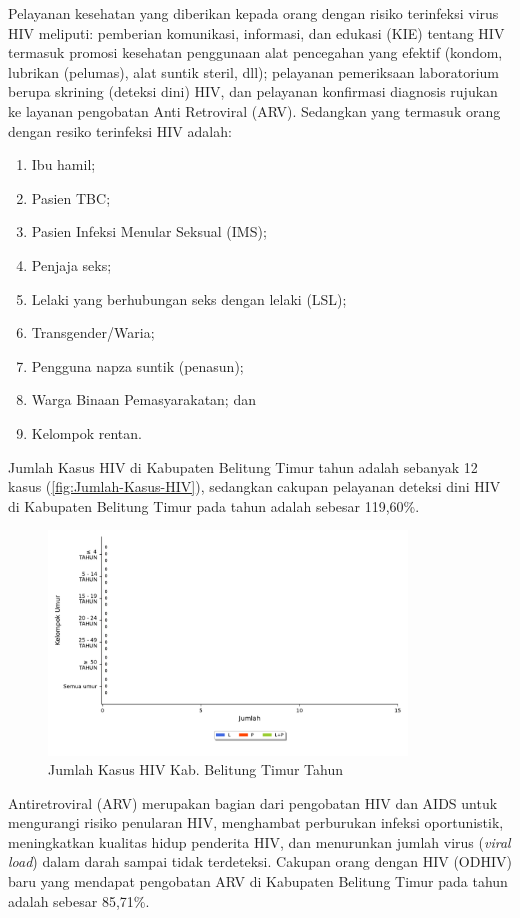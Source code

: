 Pelayanan kesehatan yang diberikan kepada orang dengan risiko terinfeksi virus HIV meliputi: pemberian komunikasi, informasi, dan edukasi (KIE) tentang HIV termasuk promosi kesehatan penggunaan alat pencegahan yang efektif (kondom, lubrikan (pelumas), alat suntik steril, dll); pelayanan pemeriksaan laboratorium berupa skrining (deteksi dini) HIV, dan pelayanan konfirmasi diagnosis rujukan ke layanan pengobatan Anti Retroviral (ARV). Sedangkan yang termasuk orang dengan resiko terinfeksi HIV adalah:
\begin{enumerate}
  \item Ibu hamil;
  \item Pasien TBC;
  \item Pasien Infeksi Menular Seksual (IMS);
  \item Penjaja seks;
  \item Lelaki yang berhubungan seks dengan lelaki (LSL);
  \item Transgender/Waria;
  \item Pengguna napza suntik (penasun);
  \item Warga Binaan Pemasyarakatan; dan
  \item Kelompok rentan.
\end{enumerate}

Jumlah Kasus HIV di Kabupaten Belitung Timur tahun \tP adalah sebanyak 12 kasus (\autoref{fig:Jumlah-Kasus-HIV}), sedangkan cakupan pelayanan deteksi dini HIV di Kabupaten Belitung Timur pada tahun \tP adalah sebesar 119,60\%.

\begin{figure}[H]
  \centering
  \includegraphics[width=0.85\textwidth]{bab_06/bab_06_03a_HIV}
  \caption{Jumlah Kasus HIV Kab. Belitung Timur Tahun \tP}
  \label{fig:Jumlah-Kasus-HIV}
\end{figure}

Antiretroviral (ARV) merupakan bagian dari pengobatan HIV dan AIDS untuk mengurangi risiko penularan HIV, menghambat perburukan infeksi oportunistik, meningkatkan kualitas hidup penderita HIV, dan menurunkan jumlah virus (\emph{viral load}) dalam darah sampai tidak terdeteksi. Cakupan orang dengan HIV (ODHIV) baru yang mendapat pengobatan ARV di Kabupaten Belitung Timur pada tahun \tP adalah sebesar 85,71\%.

